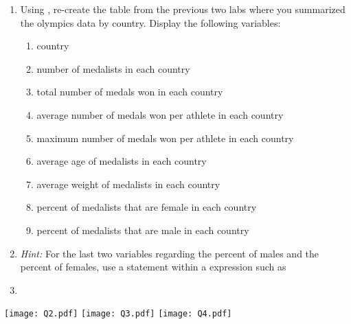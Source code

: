 \begin{enumerate}
\item Using , re-create the table from the previous two labs where you summarized the olympics data by country.  Display the following variables:
\begin{enumerate}
\item country
\item number of medalists in each country 
\item total number of medals won in each country 
\item average number of medals won per athlete in each country
\item maximum number of medals won per athlete in each country
\item average age of medalists in each country
\item average weight of medalists in each country
\item percent of medalists that are female in each country
\item percent of medalists that are male in each country
\end{enumerate}
\item[]
\emph{Hint:} For the last two variables regarding the percent of males and the percent of females, use a  statement within a  expression such as
\item[] 
\end{enumerate}
\newpage
\texttt{[image: Q2.pdf]}
\texttt{[image: Q3.pdf]}
\texttt{[image: Q4.pdf]}

 